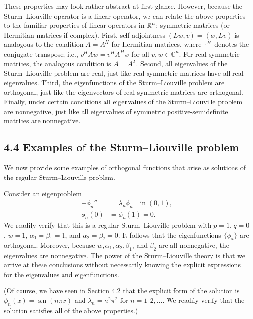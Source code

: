 These properties may look rather abstract at first glance. However, because the Sturm--Liouville operator is a linear operator, we can relate the above properties to the familiar properties of linear operators in $\mathbb{R}^n$: symmetric matrices (or Hermitian matrices if complex). First, self-adjointness $(Lw, v) = (w, Lv)$ is analogous to the condition $A = A^H$ for Hermitian matrices, where $\cdot^H$ denotes the conjugate transpose; i.e., $v^H A w = v^H A^H w$ for all $v, w \in \mathbb{C}^n$. For real symmetric matrices, the analogous condition is $A = A^T$. Second, all eigenvalues of the Sturm--Liouville problem are real, just like real symmetric matrices have all real eigenvalues. Third, the eigenfunctions of the Sturm--Liouville problem are orthogonal, just like the eigenvectors of real symmetric matrices are orthogonal. Finally, under certain conditions all eigenvalues of the Sturm--Liouville problem are nonnegative, just like all eigenvalues of symmetric positive-semidefinite matrices are nonnegative.

\subsection{4.4 Examples of the Sturm--Liouville problem}
We now provide some examples of orthogonal functions that arise as solutions of the regular Sturm--Liouville problem.

\begin{example}
    Consider an eigenproblem
    \begin{align*}
        -\phi_n'' &= \lambda_n \phi_n \quad \text{in } (0, 1), \\
        \phi_n(0) &= \phi_n(1) = 0.
    \end{align*}
    We readily verify that this is a regular Sturm--Liouville problem with $p = 1$, $q = 0$, $w = 1$, $\alpha_1 = \beta_1 = 1$, and $\alpha_2 = \beta_2 = 0$. It follows that the eigenfunctions $\{\phi_n\}$ are orthogonal. Moreover, because $w, \alpha_1, \alpha_2, \beta_1$, and $\beta_2$ are all nonnegative, the eigenvalues are nonnegative. The power of the Sturm--Liouville theory is that we arrive at these conclusions without necessarily knowing the explicit expressions for the eigenvalues and eigenfunctions.

    (Of course, we have seen in Section 4.2 that the explicit form of the solution is $\phi_n(x) = \sin(n\pi x)$ and $\lambda_n = n^2\pi^2$ for $n = 1, 2, \dots$. We readily verify that the solution satisfies all of the above properties.)
\end{example}

